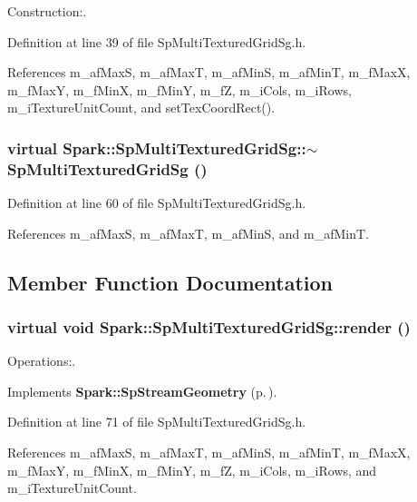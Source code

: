 Construction:. 

Definition at line 39 of file Sp\-Multi\-Textured\-Grid\-Sg.h.

References m\_\-af\-Max\-S, m\_\-af\-Max\-T, m\_\-af\-Min\-S, m\_\-af\-Min\-T, m\_\-f\-Max\-X, m\_\-f\-Max\-Y, m\_\-f\-Min\-X, m\_\-f\-Min\-Y, m\_\-f\-Z, m\_\-i\-Cols, m\_\-i\-Rows, m\_\-i\-Texture\-Unit\-Count, and set\-Tex\-Coord\-Rect().
\subsubsection{\setlength{\rightskip}{0pt plus 5cm}virtual Spark::Sp\-Multi\-Textured\-Grid\-Sg::$\sim${\bf Sp\-Multi\-Textured\-Grid\-Sg} ()\hspace{0.3cm}{\tt  [inline, virtual]}}\label{classSpark_1_1SpMultiTexturedGridSg_a1}


Definition at line 60 of file Sp\-Multi\-Textured\-Grid\-Sg.h.

References m\_\-af\-Max\-S, m\_\-af\-Max\-T, m\_\-af\-Min\-S, and m\_\-af\-Min\-T.

\subsection{Member Function Documentation}
\subsubsection{\setlength{\rightskip}{0pt plus 5cm}virtual void Spark::Sp\-Multi\-Textured\-Grid\-Sg::render ()\hspace{0.3cm}{\tt  [inline, virtual]}}\label{classSpark_1_1SpMultiTexturedGridSg_a2}


Operations:. 



Implements {\bf Spark::Sp\-Stream\-Geometry} {\rm (p.\,\pageref{classSpark_1_1SpStreamGeometry_a0})}.

Definition at line 71 of file Sp\-Multi\-Textured\-Grid\-Sg.h.

References m\_\-af\-Max\-S, m\_\-af\-Max\-T, m\_\-af\-Min\-S, m\_\-af\-Min\-T, m\_\-f\-Max\-X, m\_\-f\-Max\-Y, m\_\-f\-Min\-X, m\_\-f\-Min\-Y, m\_\-f\-Z, m\_\-i\-Cols, m\_\-i\-Rows, and m\_\-i\-Texture\-Unit\-Count.
